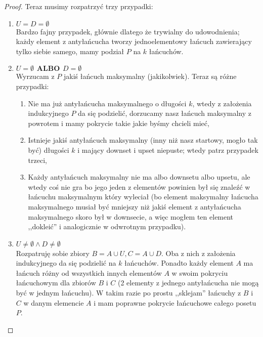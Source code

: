 \begin{proof}
	Teraz musimy rozpatrzyć trzy przypadki:
	\begin{enumerate}
		\item $U = D = \emptyset$ \\
		      Bardzo fajny przypadek, głównie dlatego że trywialny do udowodnienia; każdy element z antyłańcucha tworzy jednoelementowy łańcuch zawierający tylko siebie samego, mamy podział $P$ na $k$ łańcuchów.
		\item $U = \emptyset \hspace{5pt} \mathbf{ALBO} \hspace{5pt} D = \emptyset$ \\
		      Wyrzucam z $P$ jakiś łańcuch maksymalny (jakikolwiek). Teraz są różne przypadki: \begin{enumerate}
			      \item Nie ma już antyłańcucha maksymalnego o długości $k$, wtedy z założenia indukcyjnego $P$ da się podzielić, dorzucamy nasz łańcuch maksymalny z powrotem i mamy pokrycie takie jakie byśmy chcieli mieć,
			      \item Istnieje jakiś antyłańcuch maksymalny (inny niż nasz startowy, mogło tak być) długości $k$ i mający downset i upset niepuste; wtedy patrz przypadek trzeci,
			      \item Każdy antyłańcuch maksymalny nie ma albo downsetu albo upsetu, ale wtedy coś nie gra bo jego jeden z elementów powinien był się znaleźć w łańcuchu maksymalnym który wyleciał (bo element maksymalny łańcucha maksymalnego musiał być mniejszy niż jakiś element z antyłańcucha maksymalnego skoro był w downsecie, a więc mogłem ten element ,,dokleić'' i analogicznie w odwrotnym przypadku).
		      \end{enumerate}
		\item $U \not = \emptyset \wedge D \not = \emptyset$ \\
		      Rozpatruję sobie zbiory $B = A \cup U, C = A \cup D$. Oba z nich z założenia indukcyjnego da się podzielić na $k$ łańcuchów. Ponadto każdy element $A$ ma łańcuch różny od wszystkich innych elementów $A$ w swoim pokryciu łańcuchowym dla zbiorów $B$ i $C$ (2 elementy z jednego antyłańcucha nie mogą być w jednym łańcuchu). W takim razie po prostu ,,sklejam'' łańcuchy z $B$ i $C$ w danym elemencie $A$ i mam poprawne pokrycie łańcuchowe całego posetu $P$.

	\end{enumerate}

\end{proof}